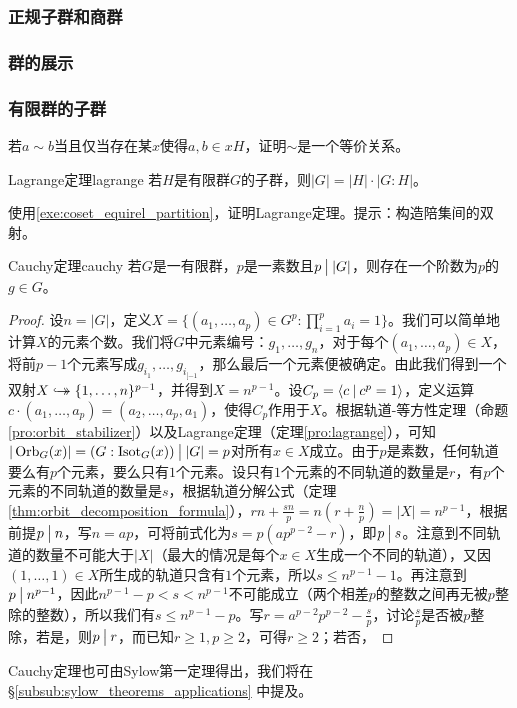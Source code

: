 \documentclass[../main.tex]{subfiles}
\begin{document}
\subsubsection{正规子群和商群}
\subsubsection{群的展示}
\subsubsection{有限群的子群}
\begin{exercise}\label{exe:coset_equirel_partition}
若$a\sim b$当且仅当存在某$x$使得$a,b\in xH$，证明$\sim$是一个等价关系。
\end{exercise}
\begin{proposition}{Lagrange定理}{lagrange}
若$H$是有限群$G$的子群，则$|G|=|H|\cdot|G:H|$。
\end{proposition}
\begin{exercise}
使用\ref{exe:coset_equirel_partition}，证明Lagrange定理。提示：构造陪集间的双射。
\end{exercise}
\begin{proposition}{Cauchy定理}{cauchy}
若$G$是一有限群，$p$是一素数且$p\mathbin{\big|}|G|$，则存在一个阶数为$p$的$g\in G$。
\end{proposition}
\begin{proof}
设$n=|G|$，定义$\displaystyle X=\{(a_1,\dots,a_p)\in G^p:\prod_{i=1}^pa_i=1\}$。我们可以简单地计算$X$的元素个数。我们将$G$中元素编号：$g_1,\dots,g_n$，对于每个$(a_1,\dots,a_p)\in X$，将前$p-1$个元素写成$g_{i_1},\dots,g_{i_{[-1}}$，那么最后一个元素便被确定。由此我们得到一个双射$X\hookrightarrow\mathrel{\mspace{-15mu}}\rightarrow\{1,\dots,n\}^{p-1}$，并得到$X=n^{p-1}$。设$C_p=\langle c\mathbin{|} c^p=1\rangle$，定义运算$c\cdot(a_1,\dots,a_p)=(a_2,\dots,a_p,a_1)$，使得$C_p$作用于$X$。根据轨道-等方性定理（命题\ref{pro:orbit_stabilizer}）以及Lagrange定理（定理\ref{pro:lagrange}），可知$|\operatorname{Orb}_G(x)|=(G:\operatorname{Isot}_G(x))\mathbin{\big|}|G|=p$对所有$x\in X$成立。由于$p$是素数，任何轨道要么有$p$个元素，要么只有$1$个元素。设只有$1$个元素的不同轨道的数量是$r$，有$p$个元素的不同轨道的数量是$s$，根据轨道分解公式（定理\ref{thm:orbit_decomposition_formula}），$rn+\frac{sn}{p}=n(r+\frac{n}{p})=|X|=n^{p-1}$，根据前提$p\mathbin{\big|} n$，写$n=ap$，可将前式化为$s=p(ap^{p-2}-r)$，即$p\mathbin{\big|} s$。注意到不同轨道的数量不可能大于$|X|$（最大的情况是每个$x\in X$生成一个不同的轨道），又因$(1,\dots,1)\in X$所生成的轨道只含有$1$个元素，所以$s\leq n^{p-1}-1$。再注意到$p\mathbin{\big|} n^{p-1}$，因此$n^{p-1}-p<s<n^{p-1}$不可能成立（两个相差$p$的整数之间再无被$p$整除的整数），所以我们有$s\leq n^{p-1}-p$。写$r=a^{p-2}p^{p-2}-\frac{s}{p}$，讨论$\frac{s}{p}$是否被$p$整除，若是，则$p\mathbin{\big|} r$，而已知$r\geq1,p\geq2$，可得$r\geq2$；若否，
\end{proof}
\begin{remark}
Cauchy定理也可由Sylow第一定理得出，我们将在\S\ref{subsub:sylow_theorems_applications} 中提及。
\end{remark}
\end{document}
